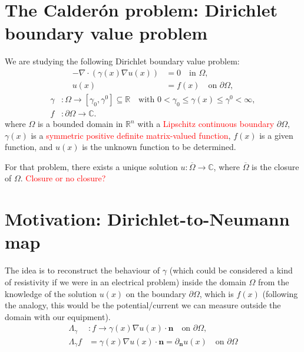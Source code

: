 \section*{The Calderón problem: Dirichlet boundary value problem}
We are studying the following Dirichlet boundary value problem:
\begin{equation}\label{calderon-problem}
    \begin{aligned}
        -\nabla \cdot (\gamma(x) \nabla u(x)) &= 0 \quad \text{in } \Omega, \\
        u(x) &= f(x) \quad \text{on } \partial \Omega,
    \end{aligned}
\end{equation}
\begin{equation}\label{calderon-problem-conditions}
    \begin{aligned}
        \gamma& :  \Omega \rightarrow [\gamma_0, \gamma^0] \subseteq \mathbb{R} \quad \text{with } 0 < \gamma_0 \leq \gamma(x) \leq \gamma^0 < \infty, \\
        f & : \partial \Omega \rightarrow \mathbb{C}.
    \end{aligned}
\end{equation}
where $\Omega$ is a bounded domain in $\mathbb{R}^n$ with a \textcolor{red}{Lipschitz continuous boundary} $\partial \Omega$, $\gamma(x)$ is a \textcolor{red}{symmetric positive definite matrix-valued function}, $f(x)$ is a given function, and $u(x)$ is the unknown function to be determined.

For that problem, there exists a unique solution $u: \overline{\Omega} \rightarrow \mathbb{C}$, where $\overline{\Omega}$ is the closure of $\Omega$.
\textcolor{red}{Closure or no closure?}

\section*{Motivation: Dirichlet-to-Neumann map}
The idea is to reconstruct the behaviour of $\gamma$ (which could be considered a kind of resistivity if we were in an electrical problem) inside the domain $\Omega$ from the knowledge of the solution $u(x)$ on the boundary $\partial \Omega$, which is $f(x)$ (following the analogy, this would be the potential/current we can measure outside the domain with our equipment).
\begin{equation}\label{dirichlet-to-neumann}
    \begin{aligned}
        \Lambda_{\gamma} & : f \rightarrow \gamma(x) \nabla u(x) \cdot \mathbf{n} \quad \text{on } \partial \Omega, \\
        \Lambda_{\gamma} f & = \gamma(x) \nabla u(x) \cdot \mathbf{n} = \partial_{\mathbf{n}} u(x) \quad \text{on } \partial \Omega
    \end{aligned}
\end{equation}

